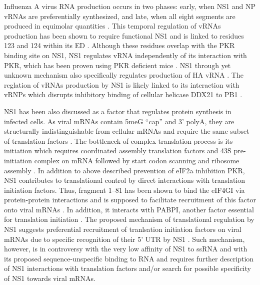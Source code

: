 		Influenza A virus RNA production occurs in two phases: early, when \gls{NS1} and \gls{NP} vRNAs are preferentially synthesized, and late, when all eight segments are produced in equimolar quantities \parencite{Shapiro1987, Skehel1973}. This temporal regulation of vRNAs production has been shown to require functional \gls{NS1} \parencite{Falcon2004} and is linked to residues 123 and 124 within its ED \parencite{Min2007}. Although these residues overlap with the \gls{PKR} binding site on NS1, NS1 regulates vRNA independently of its interaction with PKR, which has been proven using PKR deficient mice \parencite{Min2007}. NS1 through yet unknown mechanism also specifically regulates production of HA vRNA \parencite{Maamary2012}. The reglation of vRNAs production by NS1 is likely linked to its interaction with \gls{vRNP}s which disrupts inhibitory binding of cellular helicase DDX21 to PB1 \parencite{Marion1997a, Chen2014}.
		
		\gls{NS1} has been also discussed as a factor that regulates protein synthesis in infected cells. As viral mRNAs contain \gls{5meG} ``cap'' and 3' \gls{polyA}, they are structurally indistinguishable from cellular mRNAs and require the same subset of translation factors \parencite{Poch1989, Poon1999}. The bottleneck of complex translation process is its initiation which requires coordinated assembly translation factors and 43S pre-initiation complex on mRNA followed by start codon scanning and ribosome assembly \parencite{Pestova2001}. In addition to above described prevention of \gls{eIF2a} inhibition \gls{PKR}, \gls{NS1} contributes to translational control by direct interactions with translation initiation factors. Thus, fragment 1--81 has been shown to bind the \gls{eIF4GI} via protein-protein interactions and is supposed to facilitate recruitment of this factor onto viral mRNAs \parencite{Aragon2000}. In addition, it interacts with \gls{PABP}I, another factor essential for translation initiation \parencite{Burgui2003}. The proposed mechanism of translational regulation by \gls{NS1} suggests preferential recruitment of tranlsation initiation factors on viral mRNAs due to specific recognition of their 5' \gls{UTR} by NS1 \parencite{DelaLuna1995}. Such mechanism, however, is in controversy with the very low affinity of NS1 to ssRNA and with its proposed sequence-unspecific binding to RNA \parencite{Hatada1992} and requires further description of NS1 interactions with translation factors and/or search for possible specificity of NS1 towards viral mRNAs.
	
